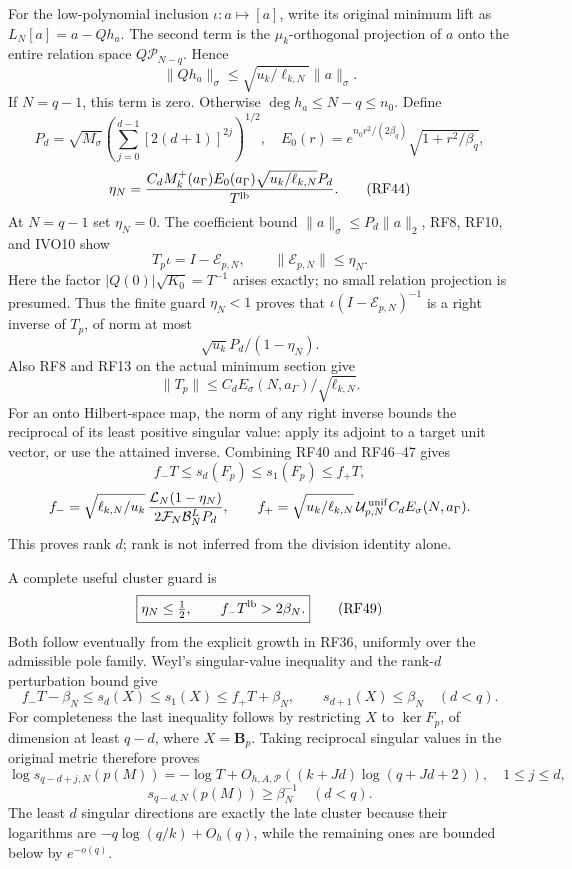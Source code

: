 \documentclass[11pt]{article}
\begin{document}
For the low-polynomial inclusion \(\iota:a\mapsto[a]\), write its original minimum lift as \(L_N[a]=a-Qh_a\). The second term is the \(\mu_k\)-orthogonal projection of \(a\) onto the entire relation space \(Q\mathcal P_{N-q}\). Hence \[
\|Qh_a\|_\sigma\le\sqrt{u_k/\ell_{k,N}}\|a\|_\sigma.
\tag{RF43}
\] If \(N=q-1\), this term is zero. Otherwise \(\deg h_a\le N-q\le n_0\). Define \[
P_d=\sqrt{M_\sigma}
 \left(\sum_{j=0}^{d-1}[2(d+1)]^{2j}\right)^{1/2},\quad
E_0(r)=e^{n_0r^2/(2\beta_q)}\sqrt{1+r^2/\beta_q},
\] \[
\eta_N=
\frac{C_dM_k^+(a_\Gamma)E_0(a_\Gamma)
 \sqrt{u_k/\ell_{k,N}}P_d}{T^{\rm lb}}.
\tag{RF44}
\] At \(N=q-1\) set \(\eta_N=0\). The coefficient bound \(\|a\|_\sigma\le P_d\|a\|_2\), RF8, RF10, and IVO10 show \[
T_p\iota=I-\mathcal E_{p,N},\qquad
\|\mathcal E_{p,N}\|\le\eta_N.
\tag{RF45}
\] Here the factor \(|Q(0)|\sqrt{K_0}=T^{-1}\) arises exactly; no small relation projection is presumed. Thus the finite guard \(\eta_N<1\) proves that \(\iota(I-\mathcal E_{p,N})^{-1}\) is a right inverse of \(T_p\), of norm at most \[
\sqrt{u_k}P_d/(1-\eta_N).
\tag{RF46}
\] Also RF8 and RF13 on the actual minimum section give \[
\|T_p\|\le C_dE_\sigma(N,a_\Gamma)/\sqrt{\ell_{k,N}}.
\tag{RF47}
\] For an onto Hilbert-space map, the norm of any right inverse bounds the reciprocal of its least positive singular value: apply its adjoint to a target unit vector, or use the attained inverse. Combining RF40 and RF46--47 gives \[
f_-T\le s_d(F_p)\le s_1(F_p)\le f_+T,
\tag{RF48}
\] \[
f_-=
\sqrt{\ell_{k,N}/u_k}\,
\frac{\mathcal L_N(1-\eta_N)}
 {2\mathcal F_N\mathcal B_N^LP_d},\qquad
f_+=
\sqrt{u_k/\ell_{k,N}}\,
\mathcal U_{p,N}^{\,\rm unif}C_dE_\sigma(N,a_\Gamma).
\] This proves rank \(d\); rank is not inferred from the division identity alone.

A complete useful cluster guard is \[
\boxed{\eta_N\le\tfrac12,\qquad f_-T^{\rm lb}>2\beta_N.}
\tag{RF49}
\] Both follow eventually from the explicit growth in RF36, uniformly over the admissible pole family. Weyl's singular-value inequality and the rank-\(d\) perturbation bound give \[
f_-T-\beta_N\le s_d(X)\le s_1(X)\le f_+T+\beta_N,\qquad
s_{d+1}(X)\le\beta_N\quad(d<q).
\tag{RF50}
\] For completeness the last inequality follows by restricting \(X\) to \(\ker F_p\), of dimension at least \(q-d\), where \(X=\mathbf B_p\). Taking reciprocal singular values in the original metric therefore proves \[
\log s_{q-d+j,N}(p(M))=-\log T+O_{h,A,\mathscr P}((k+Jd)\log(q+Jd+2)),
\quad1\le j\le d,
\] \[
s_{q-d,N}(p(M))\ge\beta_N^{-1}\quad(d<q).
\tag{RF51}
\] The least \(d\) singular directions are exactly the late cluster because their logarithms are \(-q\log(q/k)+O_h(q)\), while the remaining ones are bounded below by \(e^{-o(q)}\).
\end{document}
